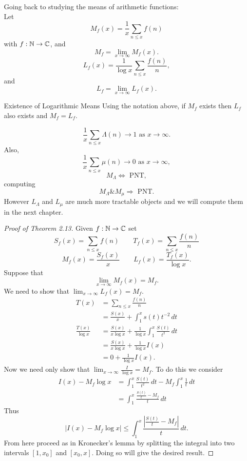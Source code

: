 \documentclass[twoside, openright, fontsize=10pt, headings=big]{scrbook}
\begin{document}
Going back to studying the means of arithmetic functions:\\
Let 
\[
    M_f(x)=\frac{1}{x}\sum_{n\leq x}f(n)
\]
with $f:\mathbb{N}\to\mathbb{C}$, and 
\[
    M_f=\lim_{x\to\infty}M_f(x).
\]
\[
    L_f(x)=\frac{1}{\log x}\sum_{n\leq x}\frac{f(n)}{n},
\]
and 
\[
    L_f=\lim_{x\to\infty}L_f(x).
\]
\begin{theorem}{Existence of Logarithmic Means}{}
    Using the notation above, if $M_f$ exists then $L_f$ also exists and $M_f=L_f$.
\end{theorem}
\begin{remark}{}{}
    \[
        \frac{1}{x}\sum_{n\leq x}\Lambda(n)\to1\text{ as } x\to\infty.
    \]
    Also,
    \[
        \frac{1}{x}\sum_{n\leq x}\mu(n)\to0\text{ as } x\to\infty,
    \]
    \[
        M_\Lambda\Leftrightarrow \text{ PNT},
    \]
    computing
    \[
        M_\Lambda\& M_\mu\Rightarrow \text{ PNT}.
    \]
    However $L_\Lambda$ and $L_\mu$ are much more tractable objects and we will compute them in the next chapter.
\end{remark}
\begin{proof}[Proof of Theorem 2.13]
    Given $f:\mathbb{N}\to\mathbb{C}$ set 
    \[
        S_f(x)=\sum_{n\leq x}f(n)\quad\quad T_f(x)=\sum_{n\leq x}\frac{f(n)}{n}
    \]
    \[
        M_f(x)=\frac{S_f(x)}{x}\quad\quad L_f(x)=\frac{T_f(x)}{\log x}.
    \]
    Suppose that
    \[
        \lim_{x\to\infty}M_f(x)=M_f.
    \]
    We need to show that $\lim_{x\to\infty}L_f(x)=M_f$.
    \begin{align*}
        T(x)&=\sum_{n\leq x}\frac{f(n)}{n}\\
        &=\frac{S(x)}{x}+\int_{1}^{x}s(t)t^{-2}\,dt\\
        \frac{T(x)}{\log x}&=\frac{S(x)}{x\log x}+\frac{1}{\log x}\int_{1}^{x}\frac{S(t)}{t^2}\,dt\\
        &=\frac{S(x)}{x\log x}+\frac{1}{\log x}I(x)\\
        &=0+\frac{1}{\log x}I(x).
    \end{align*}
    Now we need only show that $\lim_{x\to\infty}\frac{I}{\log x}=M_f$. To do this we consider 
    \begin{align*}
        I(x)-M_f\log x&=\int_{1}^{x}\frac{S(t)}{t^2}\,dt-M_f\int_{1}^{x}\frac{1}{t}\,dt\\
        &=\int_{1}^{x}\frac{\frac{S(t)}{t}-M_f}{t}\,dt
    \end{align*}
    Thus
    \[
        |I(x)-M_f\log x|\leq\int_{1}^{x}\frac{\left|\frac{S(t)}{t}-M_f\right|}{t}\,dt.
    \]
    From here proceed as in Kronecker's lemma by splitting the integral into two intervals $[1,x_0]$ and $[x_0,x]$. Doing so will give the desired result.
\end{proof}
\end{document}
